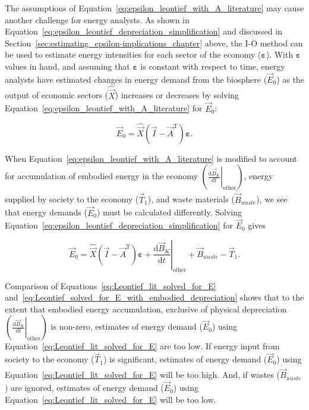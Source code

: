 The assumptions of Equation~\ref{eq:epsilon_leontief_with_A_literature}
may cause another challenge for energy analysts. 
As shown in 
Equation~\ref{eq:epsilon_leontief_depreciation_simplification}
and discussed in Section~\ref{sec:estimating_epsilon-implications_chapter} above, 
the I-O method can be used to estimate energy intensities 
for each sector of the economy ($\bm{\varepsilon}$). 
With $\bm{\varepsilon}$ values in hand,
and assuming that $\bm{\varepsilon}$ is constant with respect to time,
energy analysts have estimated changes in energy demand 
from the biosphere ($\vec{E}_{0}$) 
as the output of economic sectors ($\hat{\vec{X}}$) 
increases or decreases by solving 
Equation~\ref{eq:epsilon_leontief_with_A_literature} 
for $\vec{E}_{0}$:

\begin{equation} \label{eq:Leontief_lit_solved_for_E}
	\vec{E}_{0} 
	= \hat{\vec{X}}(\vec{I} - \vec{A}^{\mathrm{T}})\bm{\varepsilon}.
\end{equation}

When Equation~\ref{eq:epsilon_leontief_with_A_literature}
is modified to account for accumulation of embodied energy 
in the economy 
$\left( \left. \frac{\mathrm{d}\vec{B}_{K}}{\mathrm{d}t} \right|_{\mathrm{other}} \right)$,
energy supplied by society to the economy ($\vec{T}_{1}$), and
waste materials ($\dot{\vec{B}}_{waste}$),
we see that energy demands ($\vec{E}_{0}$) must be calculated differently. 
Solving Equation~\ref{eq:epsilon_leontief_depreciation_simplification} 
for $\vec{E}_{0}$ gives 

\begin{equation} \label{eq:Leontief_solved_for_E_with_embodied_depreciation}
	\vec{E}_{0} 
	= \hat{\vec{X}}
		(\vec{I} - \vec{A}^{\mathrm{T}})
		\bm{\varepsilon} 
	+ \left. \frac{\mathrm{d}\vec{B}_{K}}{\mathrm{d}t} \right|_{\mathrm{other}}
	+ \dot{\vec{B}}_{waste}
	- \vec{T}_{1}.
\end{equation}

\noindent{}Comparison of Equations~\ref{eq:Leontief_lit_solved_for_E} 
and~\ref{eq:Leontief_solved_for_E_with_embodied_depreciation}
shows that to the extent that embodied energy accumulation,
exclusive of physical depreciation
$\left( \left. \frac{\mathrm{d}\vec{B}_{K}}{\mathrm{d}t} \right|_{\mathrm{other}} \right)$
is non-zero, estimates of energy demand ($\vec{E}_{0}$) using 
Equation~\ref{eq:Leontief_lit_solved_for_E} are too low. 
If energy input from society to the economy ($\vec{T}_{1}$) is significant,
estimates of energy demand ($\vec{E}_{0}$) using 
Equation~\ref{eq:Leontief_lit_solved_for_E} will be too high. 
And, if wastes ($\dot{\vec{B}}_{waste}$) are ignored, 
estimates of energy demand ($\vec{E}_{0}$) using 
Equation~\ref{eq:Leontief_lit_solved_for_E} will be too low. 

